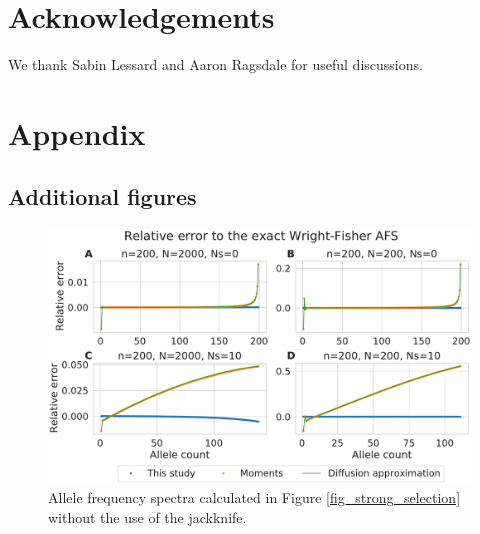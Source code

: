 \documentclass[9pt,twocolumn,twoside,lineno]{gsajnl}
\begin{document}

\section{Acknowledgements}
We thank Sabin Lessard and Aaron Ragsdale for useful discussions. 



\newcommand{\beginsupplement}{%
        \setcounter{table}{0}
        \renewcommand{\thetable}{S\arabic{table}}%
        \setcounter{figure}{0}
        \renewcommand{\thefigure}{S\arabic{figure}}%
        \setcounter{section}{0}
        \renewcommand{\thesection}{S\arabic{section}}%
     }
\beginsupplement
\section{Appendix}

\subsection{Additional figures}
\label{subsec_apx_figures}

\begin{figure}
  \centering
  \includegraphics[width=\columnwidth]{fig/afs_comp_small_no_jackknife.pdf}

    \caption{Allele frequency spectra calculated in Figure \ref{fig_strong_selection} without the use of the jackknife.    }

  \label{fig_apx_no_jackknife}
\end{figure}
\end{document}
